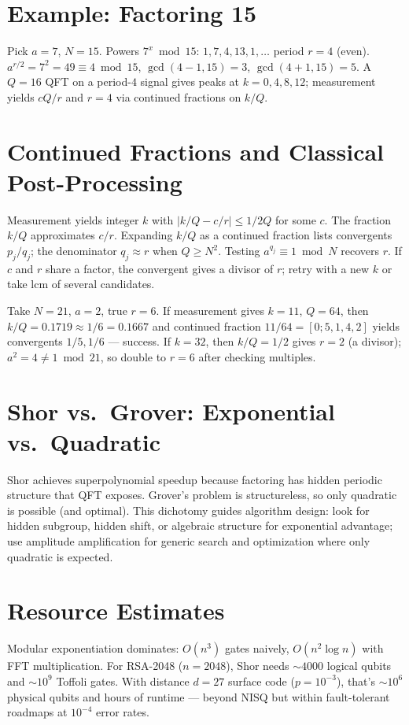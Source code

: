 \section{Example: Factoring 15}
Pick $a=7$, $N=15$. Powers $7^x\bmod15$: $1,7,4,13,1,\dots$ period $r=4$ (even). $a^{r/2}=7^2=49\equiv4\bmod15$, $\gcd(4-1,15)=3$, $\gcd(4+1,15)=5$. A $Q=16$ QFT on a period-$4$ signal gives peaks at $k=0,4,8,12$; measurement yields $cQ/r$ and $r=4$ via continued fractions on $k/Q$.


\section{Continued Fractions and Classical Post-Processing}
Measurement yields integer $k$ with $|k/Q-c/r|\le1/2Q$ for some $c$. The fraction $k/Q$ approximates $c/r$. Expanding $k/Q$ as a continued fraction lists convergents $p_j/q_j$; the denominator $q_j\approx r$ when $Q\ge N^2$. Testing $a^{q_j}\equiv1\bmod N$ recovers $r$. If $c$ and $r$ share a factor, the convergent gives a divisor of $r$; retry with a new $k$ or take $\mathrm{lcm}$ of several candidates.

\begin{example}
Take $N=21$, $a=2$, true $r=6$. If measurement gives $k=11$, $Q=64$, then $k/Q=0.1719\approx1/6=0.1667$ and continued fraction $11/64=[0;5,1,4,2]$ yields convergents $1/5,1/6$ --- success. If $k=32$, then $k/Q=1/2$ gives $r=2$ (a divisor); $a^2=4\neq1\bmod21$, so double to $r=6$ after checking multiples.
\end{example}


\section{Shor vs.\ Grover: Exponential vs.\ Quadratic}
Shor achieves superpolynomial speedup because factoring has hidden periodic structure that QFT exposes. Grover's problem is structureless, so only quadratic is possible (and optimal). This dichotomy guides algorithm design: look for hidden subgroup, hidden shift, or algebraic structure for exponential advantage; use amplitude amplification for generic search and optimization where only quadratic is expected.

\section{Resource Estimates}
Modular exponentiation dominates: $O(n^3)$ gates naively, $O(n^2\log n)$ with FFT multiplication. For RSA-2048 ($n=2048$), Shor needs $\sim4000$ logical qubits and $\sim10^9$ Toffoli gates. With distance $d=27$ surface code ($p=10^{-3}$), that's $\sim10^6$ physical qubits and hours of runtime --- beyond NISQ but within fault-tolerant roadmaps at $10^{-4}$ error rates.


